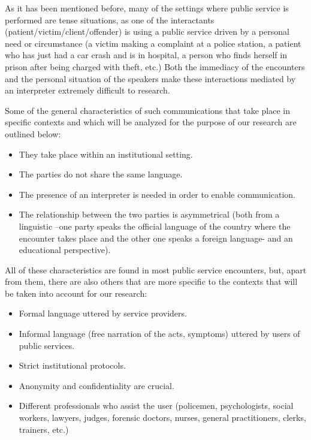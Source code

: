 \documentclass[output=paper]{LSP/langsci}
\begin{document}
As it has been mentioned before, many of the settings where public service  is performed are tense situations, as one of the interactants (patient\slash victim\slash client\slash offender) is using a public service driven by a personal need or circumstance (a  victim making a complaint at a police station, a patient who has just had a car crash and is in hospital, a person who finds herself in prison after being charged with theft, etc.) Both the immediacy of the encounters and the personal situation of the speakers make these interactions mediated by an interpreter extremely difficult to research.

Some of the general characteristics of such communications that take place in specific contexts and which will be analyzed for the purpose of our research are outlined below:

\begin{itemize}
\item They take place within an institutional setting.
\item The parties do not share the same language.
\item The presence of an interpreter is needed in order to enable communication.
\item The relationship between the two parties is asymmetrical (both from a linguistic --one party speaks the official language of the country where the encounter takes place and the other one speaks a foreign language- and an educational perspective).
\end{itemize}

All of these characteristics are found in most public service  encounters, but, apart from them, there are also others that are more specific to the contexts that will be taken into account for our research:

\begin{itemize}
\item Formal language uttered by service providers.
\end{itemize}
\begin{itemize}
\item Informal language (free narration of the acts, symptoms) uttered by users of public services.
\item Strict institutional protocols.
\item Anonymity and confidentiality are crucial.
\item Different professionals who assist the user (policemen, psychologists, social workers, lawyers, judges, forensic doctors,  nurses, general practitioners, clerks, trainers, etc.)
\end{itemize}
\end{document}
